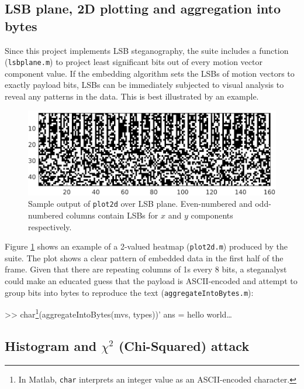 \documentclass[12pt,british,twoside,notitlepage,usenames,dvipsnames,hypens,final]{report}
\numberwithin{equation}{section}
\numberwithin{figure}{section}
\renewenvironment{alltt}{\vspace{-0.6\baselineskip}\begin{oldalltt}}{\end{oldalltt}\vspace{-0.1\baselineskip}}
\begin{document}
\subsection{LSB plane, 2D plotting and aggregation into bytes}

Since this project implements LSB steganography, the suite includes a function (\texttt{lsbplane.m}) to project least significant bits out of every motion vector component value. If the embedding algorithm sets the LSBs of motion vectors to exactly payload bits, LSBs can be immediately subjected to visual analysis to reveal any patterns in the data. This is best illustrated by an example.

\begin{figure}[tbh]
\centerline{\includegraphics{img/unencrypted-enc.eps}}
\caption{Sample output of \texttt{plot2d} over LSB plane. Even-numbered and odd-numbered columns contain LSBs for $x$ and $y$ components respectively.}
\label{fig:unencrypted-enc}
\end{figure}

Figure \ref{fig:unencrypted-enc} shows an example of a 2-valued heatmap (\texttt{plot2d.m}) produced by the suite. The plot shows a clear pattern of embedded data in the first half of the frame. Given that there are repeating columns of 1s every 8 bits, a steganalyst could make an educated guess that the payload is ASCII-encoded and attempt to group bits into bytes to reproduce the text (\texttt{aggregateIntoBytes.m}):

\begin{alltt}
    >> char\footnote{In Matlab, \texttt{char} interprets an integer value as an ASCII-encoded character.}(aggregateIntoBytes(mvs, types))'
    ans = hello world\ldots
\end{alltt}

\subsection{Histogram and $\chi^2$ (Chi-Squared) attack}
\label{hist-chisq-attack}
\end{document}
